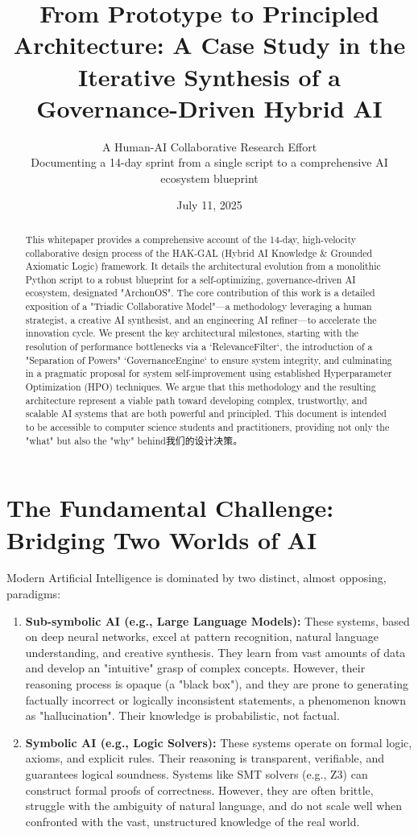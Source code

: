 \documentclass[11pt, a4paper]{article}
\title{\textbf{From Prototype to Principled Architecture: A Case Study in the Iterative Synthesis of a Governance-Driven Hybrid AI}\\[1cm]}
\author{A Human-AI Collaborative Research Effort \\ \small{Documenting a 14-day sprint from a single script to a comprehensive AI ecosystem blueprint}}
\date{July 11, 2025}
\begin{document}
\maketitle
\thispagestyle{empty}
\tableofcontents
\newpage

\begin{abstract}
\noindent This whitepaper provides a comprehensive account of the 14-day, high-velocity collaborative design process of the HAK-GAL (Hybrid AI Knowledge & Grounded Axiomatic Logic) framework. It details the architectural evolution from a monolithic Python script to a robust blueprint for a self-optimizing, governance-driven AI ecosystem, designated "ArchonOS". The core contribution of this work is a detailed exposition of a "Triadic Collaborative Model"—a methodology leveraging a human strategist, a creative AI synthesist, and an engineering AI refiner—to accelerate the innovation cycle. We present the key architectural milestones, starting with the resolution of performance bottlenecks via a `RelevanceFilter`, the introduction of a "Separation of Powers" `GovernanceEngine` to ensure system integrity, and culminating in a pragmatic proposal for system self-improvement using established Hyperparameter Optimization (HPO) techniques. We argue that this methodology and the resulting architecture represent a viable path toward developing complex, trustworthy, and scalable AI systems that are both powerful and principled. This document is intended to be accessible to computer science students and practitioners, providing not only the "what" but also the "why" behind我们的设计决策。
\end{abstract}

\section{The Fundamental Challenge: Bridging Two Worlds of AI}
\label{sec:challenge}

Modern Artificial Intelligence is dominated by two distinct, almost opposing, paradigms:

\begin{enumerate}
    \item \textbf{Sub-symbolic AI (e.g., Large Language Models):} These systems, based on deep neural networks, excel at pattern recognition, natural language understanding, and creative synthesis. They learn from vast amounts of data and develop an "intuitive" grasp of complex concepts. However, their reasoning process is opaque (a "black box"), and they are prone to generating factually incorrect or logically inconsistent statements, a phenomenon known as "hallucination". Their knowledge is probabilistic, not factual.
    
    \item \textbf{Symbolic AI (e.g., Logic Solvers):} These systems operate on formal logic, axioms, and explicit rules. Their reasoning is transparent, verifiable, and guarantees logical soundness. Systems like SMT solvers (e.g., Z3) can construct formal proofs of correctness. However, they are often brittle, struggle with the ambiguity of natural language, and do not scale well when confronted with the vast, unstructured knowledge of the real world.
\end{enumerate}
\end{document}
